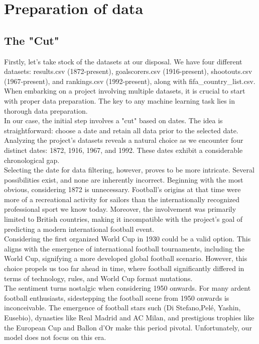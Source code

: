 \chapter{Preparation of data}
\section{The "Cut"}
Firstly, let's take stock of the datasets at our disposal. We have four different datasets: results.csv (1872-present), goalscorers.csv (1916-present), shootouts.csv (1967-present), and rankings.csv (1992-present), along with fifa\_country\_list.csv.\\

When embarking on a project involving multiple datasets, it is crucial to start with proper data preparation. The key to any machine learning task lies in thorough data preparation.\\

In our case, the initial step involves a "cut" based on dates. The idea is straightforward: choose a date and retain all data prior to the selected date. Analyzing the project's datasets reveals a natural choice as we encounter four distinct dates: 1872, 1916, 1967, and 1992. These dates exhibit a considerable chronological gap.\\

Selecting the date for data filtering, however, proves to be more intricate. Several possibilities exist, and none are inherently incorrect. Beginning with the most obvious, considering 1872 is unnecessary. Football's origins at that time were more of a recreational activity for sailors than the internationally recognized professional sport we know today. Moreover, the involvement was primarily limited to British countries, making it incompatible with the project's goal of predicting a modern international football event.\\

Considering the first organized World Cup in 1930 could be a valid option. This aligns with the emergence of international football tournaments, including the World Cup, signifying a more developed global football scenario. However, this choice propels us too far ahead in time, where football significantly differed in terms of technology, rules, and World Cup format mutations.\\

The sentiment turns nostalgic when considering 1950 onwards. For many ardent football enthusiasts, sidestepping the football scene from 1950 onwards is inconceivable. The emergence of football stars such (Di Stefano,Pelé, Yashin, Eusebio), dynasties like Real Madrid and AC Milan, and prestigious trophies like the European Cup and Ballon d'Or make this period pivotal. Unfortunately, our model does not focus on this era.\\

